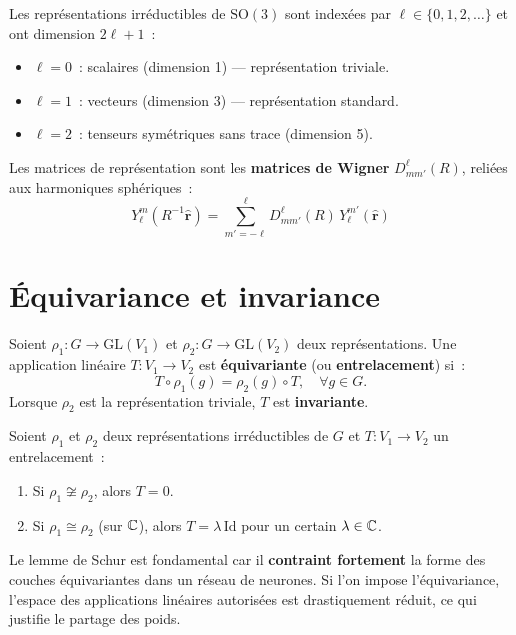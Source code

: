 \begin{formules}[title=\textbf{Repr\'esentations irr\'eductibles de $\mathrm{SO}(3)$}]
Les repr\'esentations irr\'eductibles de $\mathrm{SO}(3)$ sont index\'ees par
$\ell \in \{0, 1, 2, \ldots\}$ et ont dimension $2\ell + 1$~:
\begin{itemize}
    \item $\ell = 0$~: scalaires (dimension 1) --- repr\'esentation triviale.
    \item $\ell = 1$~: vecteurs (dimension 3) --- repr\'esentation standard.
    \item $\ell = 2$~: tenseurs sym\'etriques sans trace (dimension 5).
\end{itemize}
Les matrices de repr\'esentation sont les \textbf{matrices de Wigner}
$D^\ell_{mm'}(R)$, reli\'ees aux harmoniques sph\'eriques~:
\[
    Y_\ell^m(R^{-1}\hat{\mathbf{r}}) = \sum_{m'=-\ell}^{\ell}
    D^\ell_{mm'}(R)\, Y_\ell^{m'}(\hat{\mathbf{r}})
\]
\end{formules}

\section{\'Equivariance et invariance}

\begin{definition}
Soient $\rho_1: G \to \mathrm{GL}(V_1)$ et $\rho_2: G \to \mathrm{GL}(V_2)$
deux repr\'esentations. Une application lin\'eaire $T: V_1 \to V_2$ est
\textbf{\'equivariante} (ou \textbf{entrelacement}) si~:
\[
    T \circ \rho_1(g) = \rho_2(g) \circ T, \quad \forall g \in G.
\]
Lorsque $\rho_2$ est la repr\'esentation triviale, $T$ est \textbf{invariante}.
\end{definition}

\begin{theoreme}
Soient $\rho_1$ et $\rho_2$ deux repr\'esentations irr\'eductibles de $G$ et
$T: V_1 \to V_2$ un entrelacement~:
\begin{enumerate}
    \item Si $\rho_1 \not\cong \rho_2$, alors $T = 0$.
    \item Si $\rho_1 \cong \rho_2$ (sur $\mathbb{C}$), alors $T = \lambda\, \mathrm{Id}$
          pour un certain $\lambda \in \mathbb{C}$.
\end{enumerate}
\end{theoreme}

\begin{intuition}[title=\textbf{Importance du lemme de Schur}]
Le lemme de Schur est fondamental car il \textbf{contraint fortement} la forme
des couches \'equivariantes dans un r\'eseau de neurones. Si l'on impose
l'\'equivariance, l'espace des applications lin\'eaires autoris\'ees est
drastiquement r\'eduit, ce qui justifie le partage des poids.
\end{intuition}

